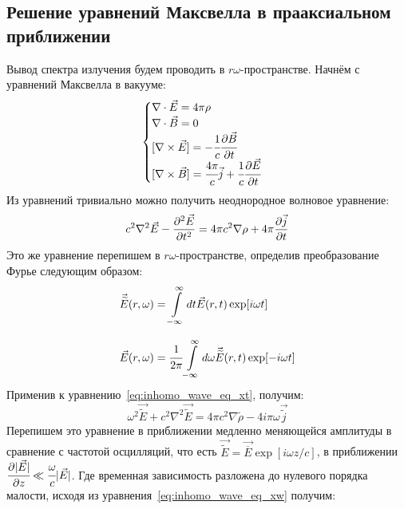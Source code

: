 \subsection{Решение уравнений Максвелла в прааксиальном приближении}
Вывод спектра излучения будем проводить в $r\omega$-пространстве. Начнём с уравнений Максвелла в вакууме:
\begin{equation}
	\begin{cases}
		\nabla \cdot \vec{E} = 4\pi \rho\\
		\nabla \cdot \vec{B} = 0\\
		[\nabla \times \vec{E}] = -\cfrac{1}{c} \cfrac{\partial\vec{B}}{\partial t}\\
		[\nabla \times \vec{B}] = \cfrac{4\pi}{c} \vec{j} + \cfrac{1}{c} \cfrac{\partial\vec{E}}{\partial t}
	\end{cases} 
\end{equation}
Из уравнений тривиально можно получить неоднородное волновое уравнение: 
\begin{equation}
	\label{eq:inhomo_wave_eq_xt}
	c^2 \nabla^2 \vec{E} - \pdv[2]{\vec{E}}{t} = 4\pi c^2 \nabla \rho + 4\pi \pdv{\vec{j}}{t}
\end{equation}
Это же уравнение перепишем в $r\omega$-пространстве, определив преобразование Фурье следующим образом:
\begin{equation}
	\label{eq:Fourier_wt}
	\begin{array}{lcl}
		\vec{\widetilde{E}}(r, \omega) = \displaystyle\int\limits_{-\infty}^{\infty} dt \vec{E}(r, t)\exp[i\omega t]\\
		\\
		\vec{E}(r, \omega) = \cfrac{1}{2\pi}\displaystyle\int\limits_{-\infty}^{\infty} d\omega \vec{\widetilde{E}}(r, t)\exp[-i\omega t]
	\end{array}
\end{equation}
Применив к уравнению~\ref{eq:inhomo_wave_eq_xt}, получим:
\begin{equation}
	\label{eq:inhomo_wave_eq_xw}
	\omega^2 \vec{\widetilde{E}} + c^2 \nabla^2 \vec{\widetilde{E}} = 4\pi c^2 \nabla  \widetilde{\rho} - 4i\pi\omega\vec{\widetilde{j}}
\end{equation}
Перепишем это уравнение в приближении медленно меняющейся амплитуды в сравнение с частотой осцилляций, что есть $\vec{\widetilde{E}} =  \vec{\overline{E}}\exp[i\omega z/c]$, в приближении $\cfrac{\partial |\vec{E}|}{\partial z} \ll \cfrac{\omega}{c}|\vec{E}|$. Где временная зависимость разложена до нулевого порядка малости, исходя из уравнения~\ref{eq:inhomo_wave_eq_xw} получим:
